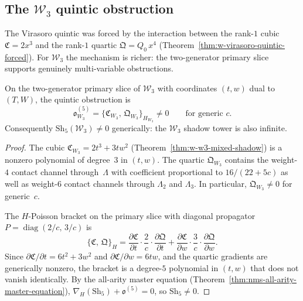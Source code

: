 \subsection{The \texorpdfstring{$\mathcal{W}_3$}{W3} quintic obstruction}
\label{subsec:w-w3-quintic-obstruction}

The Virasoro quintic was forced by the interaction between the
rank-$1$ cubic $\mathfrak C = 2x^3$ and the rank-$1$ quartic
$\mathfrak Q = Q_0\,x^4$
(Theorem~\ref{thm:w-virasoro-quintic-forced}).  For $\mathcal{W}_3$
the mechanism is richer: the two-generator primary slice supports
genuinely multi-variable obstructions.

\begin{proposition}
\label{prop:w-w3-quintic-obstruction}
On the two-generator primary slice of $\mathcal{W}_3$ with
coordinates $(t,w)$ dual to $(T,W)$, the quintic obstruction is
\begin{equation}
\label{eq:w-w3-quintic-obstruction}
\mathfrak o^{(5)}_{W_3}
= \bigl\{\mathfrak C_{W_3},\,
\mathfrak Q_{W_3}\bigr\}_{H_{W_3}}
\neq 0
\qquad\text{for generic~$c$}.
\end{equation}
Consequently $\mathrm{Sh}_5(\mathcal{W}_3) \neq 0$ generically:
the $\mathcal{W}_3$ shadow tower is also infinite.
\end{proposition}

\begin{proof}
The cubic $\mathfrak C_{W_3} = 2t^3 + 3tw^2$
(Theorem~\ref{thm:w-w3-mixed-shadow}) is a nonzero polynomial of
degree~$3$ in $(t,w)$.  The quartic $\mathfrak Q_{W_3}$ contains
the weight-$4$ contact channel through~$\Lambda$ with coefficient
proportional to $16/(22+5c)$ as well as weight-$6$ contact
channels through $\Lambda_2$ and $\Lambda_3$.  In particular,
$\mathfrak Q_{W_3}\neq 0$ for generic~$c$.

The $H$-Poisson bracket on the primary slice with diagonal
propagator $P = \operatorname{diag}(2/c,\,3/c)$ is
\[
\bigl\{\mathfrak C,\,\mathfrak Q\bigr\}_{H}
= \frac{\partial\mathfrak C}{\partial t}\cdot \frac{2}{c}\cdot
\frac{\partial\mathfrak Q}{\partial t}
+ \frac{\partial\mathfrak C}{\partial w}\cdot \frac{3}{c}\cdot
\frac{\partial\mathfrak Q}{\partial w}.
\]
Since $\partial\mathfrak C/\partial t = 6t^2 + 3w^2$ and
$\partial\mathfrak C/\partial w = 6tw$, and the quartic gradients
are generically nonzero, the bracket is a degree-$5$ polynomial
in $(t,w)$ that does not vanish identically.  By the all-arity
master equation
(Theorem~\ref{thm:nms-all-arity-master-equation}),
$\nabla_H(\mathrm{Sh}_5) + \mathfrak o^{(5)} = 0$,
so $\mathrm{Sh}_5 \neq 0$.\qedhere
\end{proof}

